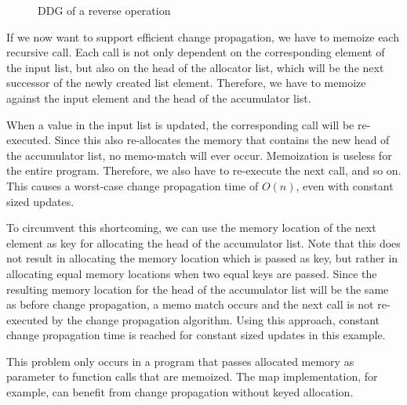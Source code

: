 \begin{figure}
\begin{center}
\end{center}
\caption{DDG of a reverse operation}
\label{fig:reverse_ddg}
\end{figure}

If we now want to support efficient change propagation, we have to memoize each recursive call. Each call is not only dependent on the corresponding element of the input list, but also on the head of the allocator list, which will be the next successor of the newly created list element. Therefore, we have to memoize against the input element and the head of the accumulator list. 

When a value in the input list is updated, the corresponding call will be re-executed. Since this also re-allocates the memory that contains the new head of the accumulator list, no memo-match will ever occur. Memoization is useless for the entire program. Therefore, we also have to re-execute the next call, and so on. This causes a worst-case change propagation time of $O(n)$, even with constant sized updates. 

To circumvent this shortcoming, we can use the memory location of the next element as key for allocating the head of the accumulator list. Note that this does not result in allocating the memory location which is passed as key, but rather in allocating equal memory locations when two equal keys are passed. Since the resulting memory location for the head of the accumulator list will be the same as before change propagation, a memo match occurs and the next call is not re-executed by the change propagation algorithm. Using this approach, constant change propagation time is reached for constant sized updates in this example. 

This problem only occurs in a program that passes allocated memory as parameter to function calls that are memoized. The map implementation, for example, can benefit from change propagation without keyed allocation.  

